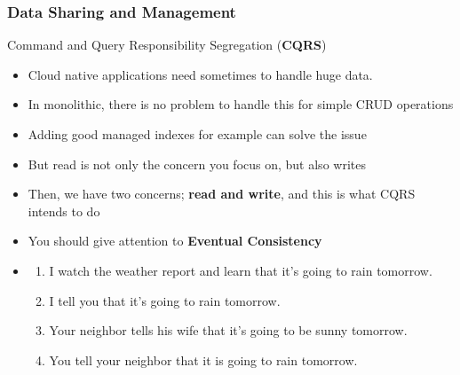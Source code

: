 \documentclass{beamer}
\begin{document}
	\begin{frame}
		\frametitle{Data Sharing and Management}
		Command and Query Responsibility Segregation (\textbf{CQRS})
			\begin{itemize}
				\item<1->[] \small{Cloud native applications need sometimes to handle huge data.}
				\vspace{1mm}
				\item<1-> \scriptsize{In monolithic, there is no problem to handle this for simple CRUD operations}
				\item<1-> \scriptsize{Adding good managed indexes for example can solve the issue}
				\item<1-> \scriptsize{But read is not only the concern you focus on, but also writes}
				\item<1-> \scriptsize{Then, we have two concerns; \textbf{read and write}, and this is what CQRS intends to do}
				\item<1-> \scriptsize{\alert{You should give attention to \textbf{Eventual Consistency}}}
				\item<2->[]
					\begin{enumerate}
						\item<1-> \scriptsize{I watch the weather report and learn that it's going to rain tomorrow.}
						\item<3-> \scriptsize{I tell you that it's going to rain tomorrow.}
						\item<4-> \scriptsize{Your neighbor tells his wife that it's going to be sunny tomorrow.}
						\item<5-> \scriptsize{You tell your neighbor that it is going to rain tomorrow.	}
					\end{enumerate}
			\end{itemize}
		\vspace{100mm}
	\end{frame}
\end{document}
